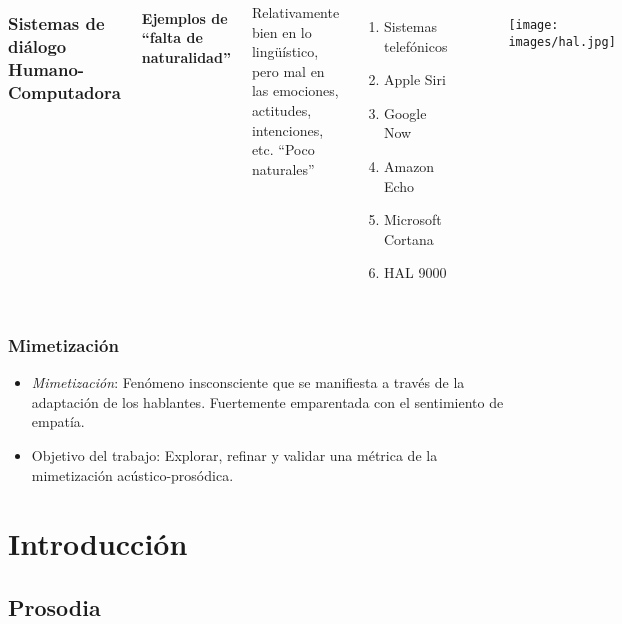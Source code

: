 \begin{frame}
  \begin{columns}
    \frametitle{Sistemas de diálogo Humano-Computadora}
    \framesubtitle{Ejemplos de ``falta de naturalidad''}

    Relativamente bien en lo lingüístico, pero mal en las emociones, actitudes, intenciones, etc. ``Poco naturales''

    \begin{enumerate}
      \item Sistemas telefónicos
      \item Apple Siri
      \item Google Now
      \item Amazon Echo
      \item Microsoft Cortana
      \item HAL 9000
    \end{enumerate}
    \begin{figure}
      \texttt{[image: images/hal.jpg]}
    \end{figure}
  \end{columns}
\end{frame}

\begin{frame}
  \frametitle{Mimetización}
  \begin{itemize}
    \item \emph{Mimetización}: Fenómeno insconsciente que se manifiesta a través de la adaptación de los hablantes. Fuertemente emparentada con el sentimiento de empatía.
    \item Objetivo del trabajo: Explorar, refinar y validar una métrica de la mimetización acústico-prosódica.
  \end{itemize}

\end{frame}

\section{Introducción}

\subsection{Prosodia}


